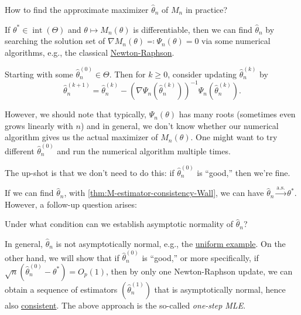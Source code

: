 \begin{problem*}
	How to find the approximate maximizer \(\hat{\theta} _n\) of \(M_n\) in practice?
\end{problem*}
\begin{answer}
	If \(\theta ^{\ast} \in \operatorname{int}(\Theta ) \) and \(\theta \mapsto M_n(\theta )\) is differentiable, then we can find \(\hat{\theta} _n\) by searching the solution set of \(\nabla M_n(\theta ) \eqqcolon \Psi _n(\theta ) = 0\) via some numerical algorithms, e.g., the classical \href{https://en.wikipedia.org/wiki/Newton%27s_method}{Newton-Raphson}.
\end{answer}

\begin{prev}
	Starting with some \(\hat{\theta} _n^{(0)} \in \Theta \). Then for \(k \geq 0\), consider updating \(\hat{\theta} _n^{(k)}\) by
	\[
		\hat{\theta} _n^{(k+1)}
		= \hat{\theta} _n^{(k)} - \left( \nabla \Psi _n(\hat{\theta} _n^{(k)}) \right) ^{-1} \Psi _n(\hat{\theta} _n^{(k)}).
	\]
\end{prev}

However, we should note that typically, \(\Psi _n(\theta )\) has many roots (sometimes even grows linearly with \(n\)) and in general, we don't know whether our numerical algorithm gives us the actual maximizer of \(M_n(\theta )\). One might want to try different \(\hat{\theta} _n^{(0)}\) and run the numerical algorithm multiple times.

\begin{intuition}
	The up-shot is that we don't need to do this: if \(\hat{\theta} _n^{(0)}\) is ``good,'' then we're fine.
\end{intuition}

If we can find \(\hat{\theta} _n\), with \autoref{thm:M-estimator-consistency-Wall}, we can have \(\hat{\theta} _n \overset{\text{a.s.} }{\to} \theta ^{\ast} \). However, a follow-up question arises:

\begin{problem*}
	Under what condition can we establish asymptotic normality of \(\hat{\theta} _n\)?
\end{problem*}
\begin{answer}
	In general, \(\hat{\theta} _n\) is not asymptotically normal, e.g., the \hyperref[eg:uniform-is-not-asymptotically-normal]{uniform example}. On the other hand, we will show that if \(\hat{\theta} _n^{(0)}\) is ``good,'' or more specifically, if \(\sqrt{n} (\hat{\theta} _n^{(0)} - \theta ^{\ast} ) = O_p(1)\), then by only one Newton-Raphson update, we can obtain a sequence of estimators \((\hat{\theta} _n^{(1)})\) that is asymptotically normal, hence also \hyperref[def:consistent]{consistent}. The above approach is the so-called \emph{one-step MLE}.
\end{answer}